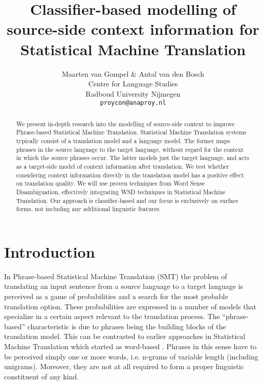 \documentclass[11pt]{article}
\title{Classifier-based modelling of source-side context information for Statistical Machine Translation}
\author{Maarten van Gompel \& Antal van den Bosch \\
 Centre for Language Studies \\
  Radboud University Nijmegen \\
  {\tt proycon@anaproy.nl}}
\begin{document}
\maketitle

\begin{abstract} 
We present in-depth research into the modelling of source-side
context to improve Phrase-based Statistical Machine Translation. Statistical
Machine Translation systems typically consist of a translation model and a
language model. The former maps phrases in the source language to the target
language, without regard for the context in which the source phrases occur. The
latter models just the target language, and acts as a target-side model of
context information after translation. We test whether considering context
information directly in the translation model has a positive effect on
translation quality. We will use proven techniques from Word Sense
Disambiguation, effectively integrating WSD techniques in Statistical Machine
Translation. Our approach is classifier-based and our focus is exclusively on
surface forms, not including any additional linguistic features.
\end{abstract}

\section{Introduction}

In Phrase-based Statistical Machine Translation (SMT) the problem of
translating an input sentence from a source language to a target language is
perceived as a game of probabilities and a search for the most probable
translation option.  These probabilities are expressed in a number of models
that specialize in a certain aspect relevant to the translation process. The
``phrase-based'' characteristic is due to phrases being the building blocks of
the translation model. This can be contrasted to earlier approaches in
Statistical Machine Translation which started as word-based \cite{OCHNEY?}.
Phrases in this sense have to be perceived simply one or more words, i.e. n-grams of variable
length (including unigrams). Moreover, they are not at all required to form a proper
linguistic constituent of any kind.
\end{document}
